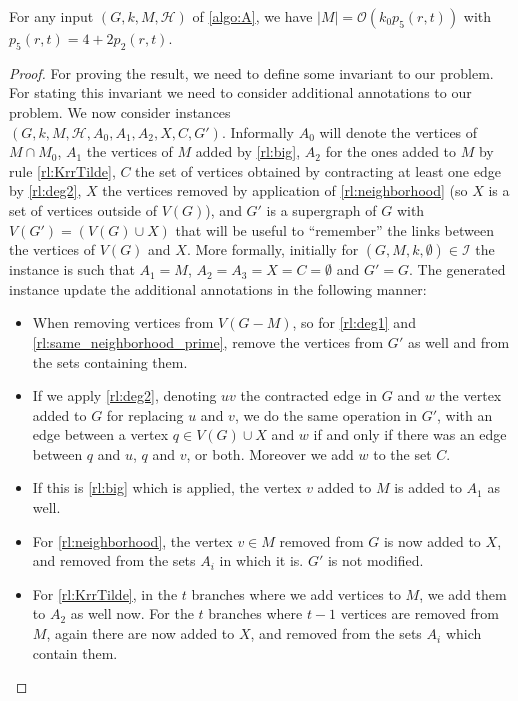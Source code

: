 \documentclass{amsart}
\newcommand{\I}{\mathcal{I}}
\newcommand{\mH}{\mathcal{H}}
\newcommand{\ruleref}[1]{\hyperref[#1]{\ref*{#1}}}
\renewcommand{\O}{\mathcal{O}}
\begin{document}
\begin{lemma}\label{lm:sizeM}
For any input $(G,k,M,\mH)$ of \autoref{algo:A}, we have $|M|=\O(k_0p_5(r,t))$ with $p_5(r,t)=4+2p_2(r,t)$.
\end{lemma}
\begin{proof}
For proving the result, we need to define some invariant to our problem. For stating this invariant we need to consider additional annotations to our problem. We now consider instances\\ $(G,k,M,\mH,A_0,A_1,A_2,X,C,G')$. Informally $A_0$ will denote the vertices of $M\cap M_0$, $A_1$ the vertices of $M$ added by \ruleref{rl:big}, $A_2$ for the ones added to $M$ by rule \ruleref{rl:KrrTilde}, $C$ the set of vertices obtained by contracting at least one edge by \ruleref{rl:deg2}, $X$ the vertices removed by application of \ruleref{rl:neighborhood} (so $X$ is a set of vertices outside of $V(G)$), and $G'$ is a supergraph of $G$ with $V(G')=(V(G)\cup X)$ that will be useful to ``remember'' the links between the vertices of $V(G)$ and $X$. More formally, initially for $(G,M,k,\emptyset)\in \I$ the instance is such that $A_1=M$, $A_2=A_3=X=C=\emptyset$ and $G'=G$. The generated instance update the additional annotations in the following manner:
\begin{itemize}
    \item When removing vertices from $V(G-M)$, so for \ruleref{rl:deg1} and \ruleref{rl:same_neighborhood_prime}, remove the vertices from $G'$ as well and from the sets containing them.
    \item If we apply \ruleref{rl:deg2}, denoting $uv$ the contracted edge in $G$ and $w$ the vertex added to $G$ for replacing $u$ and $v$, we do the same operation in $G'$, with an edge between a vertex $q\in V(G)\cup X$ and $w$ if and only if there was an edge between $q$ and $u$, $q$ and $v$, or both. Moreover we add $w$ to the set $C$.
    \item If this is \ruleref{rl:big} which is applied, the vertex $v$ added to $M$ is added to $A_1$ as well.
    \item For \ruleref{rl:neighborhood}, the vertex $v\in M$ removed from $G$ is now added to $X$, and removed from the sets $A_i$ in which it is. $G'$ is not modified.
    \item For \ruleref{rl:KrrTilde}, in the $t$ branches where we add vertices to $M$, we add them to $A_2$ as well now. For the $t$ branches where $t-1$ vertices are removed from $M$, again there are now added to $X$, and removed from the sets $A_i$ which contain them.

\end{itemize}
\end{proof}
\end{document}
